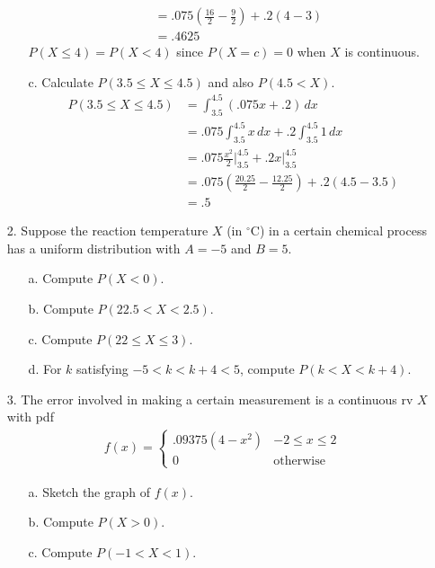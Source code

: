 \documentclass[letterpaper,12pt]{article}
\begin{document}
\begin{enumerate}
\begin{enumerate}
\begin{align*}
          &= .075\left(\frac{16}{2} - \frac{9}{2}\right) + .2(4 - 3) \\
          &= .4625
        \end{align*}
        $P(X \le 4) = P(X < 4)$ since $P(X = c) = 0$ when $X$ is continuous.
      \item[c.]
        Calculate $P(3.5 \le X \le 4.5)$ and also $P(4.5 < X)$.
        \begin{align*}
          P(3.5 \le X \le 4.5) &= \int_{3.5}^{4.5} (.075x + .2)\,dx \\
          &= .075\int_{3.5}^{4.5} x\,dx + .2\int_{3.5}^{4.5} 1\,dx \\
          &= .075\frac{x^2}{2}\bigg\rvert_{3.5}^{4.5} + .2x\big\rvert_{3.5}^{4.5} \\
          &= .075\left(\frac{20.25}{2} - \frac{12.25}{2}\right) + .2(4.5 - 3.5) \\
          &= .5
        \end{align*}
    \end{enumerate}
  \item[2.]
    Suppose the reaction temperature $X$ (in $^\circ$C) in a certain chemical process has a uniform distribution with $A = -5$ and $B = 5$.
    \begin{enumerate}
      \item[a.]
        Compute $P(X < 0)$.
      \item[b.]
        Compute $P(22.5 < X < 2.5)$.
      \item[c.]
        Compute $P(22 \le X \le 3)$.
      \item[d.]
        For $k$ satisfying $-5 < k < k + 4 < 5$, compute $P(k < X < k + 4)$.
    \end{enumerate}
  \item[3.]
    The error involved in making a certain measurement is a continuous rv $X$ with pdf
    \begin{align*}
      f(x) = \begin{cases}
        .09375(4 - x^2) & -2 \le x \le 2 \\
        0               & \text{otherwise}
      \end{cases}
    \end{align*}
    \begin{enumerate}
      \item[a.]
        Sketch the graph of $f(x)$.
      \item[b.]
        Compute $P(X > 0)$.
      \item[c.]
        Compute $P(-1 < X < 1)$.

\end{enumerate}
\end{enumerate}
\end{document}
